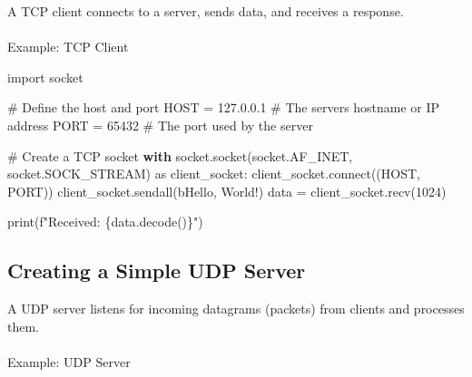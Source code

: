 \documentclass[
  letterpaper,
  DIV=11,
  numbers=noendperiod]{scrreprt}
\makeatletter
\let\oldparagraph\paragraph
\renewcommand{\paragraph}{
    \@ifstar
      \xxxParagraphStar
      \xxxParagraphNoStar
  }
\newcommand{\xxxParagraphStar}[1]{\oldparagraph*{#1}\mbox{}}
\newcommand{\xxxParagraphNoStar}[1]{\oldparagraph{#1}\mbox{}}
\newenvironment{Shaded}{\begin{snugshade}}{\end{snugshade}}
\newcommand{\BuiltInTok}[1]{\textcolor[rgb]{0.00,0.23,0.31}{#1}}
\newcommand{\CommentTok}[1]{\textcolor[rgb]{0.37,0.37,0.37}{#1}}
\newcommand{\ControlFlowTok}[1]{\textcolor[rgb]{0.00,0.23,0.31}{\textbf{#1}}}
\newcommand{\DecValTok}[1]{\textcolor[rgb]{0.68,0.00,0.00}{#1}}
\newcommand{\ExtensionTok}[1]{\textcolor[rgb]{0.00,0.23,0.31}{#1}}
\newcommand{\ImportTok}[1]{\textcolor[rgb]{0.00,0.46,0.62}{#1}}
\newcommand{\NormalTok}[1]{\textcolor[rgb]{0.00,0.23,0.31}{#1}}
\newcommand{\OperatorTok}[1]{\textcolor[rgb]{0.37,0.37,0.37}{#1}}
\newcommand{\SpecialCharTok}[1]{\textcolor[rgb]{0.37,0.37,0.37}{#1}}
\newcommand{\SpecialStringTok}[1]{\textcolor[rgb]{0.13,0.47,0.30}{#1}}
\newcommand{\StringTok}[1]{\textcolor[rgb]{0.13,0.47,0.30}{#1}}
\makeatother
\begin{document}
A TCP client connects to a server, sends data, and receives a response.

\paragraph{Example: TCP Client}\label{example-tcp-client}

\begin{Shaded}
\begin{Highlighting}[]
\ImportTok{import}\NormalTok{ socket}

\CommentTok{\# Define the host and port}
\NormalTok{HOST }\OperatorTok{=} \StringTok{\textquotesingle{}127.0.0.1\textquotesingle{}}  \CommentTok{\# The server\textquotesingle{}s hostname or IP address}
\NormalTok{PORT }\OperatorTok{=} \DecValTok{65432}        \CommentTok{\# The port used by the server}

\CommentTok{\# Create a TCP socket}
\ControlFlowTok{with}\NormalTok{ socket.socket(socket.AF\_INET, socket.SOCK\_STREAM) }\ImportTok{as}\NormalTok{ client\_socket:}
\NormalTok{    client\_socket.}\ExtensionTok{connect}\NormalTok{((HOST, PORT))}
\NormalTok{    client\_socket.sendall(}\StringTok{b\textquotesingle{}Hello, World!\textquotesingle{}}\NormalTok{)}
\NormalTok{    data }\OperatorTok{=}\NormalTok{ client\_socket.recv(}\DecValTok{1024}\NormalTok{)}

\BuiltInTok{print}\NormalTok{(}\SpecialStringTok{f"Received: }\SpecialCharTok{\{}\NormalTok{data}\SpecialCharTok{.}\NormalTok{decode()}\SpecialCharTok{\}}\SpecialStringTok{"}\NormalTok{)}
\end{Highlighting}
\end{Shaded}

\subsection{Creating a Simple UDP
Server}\label{creating-a-simple-udp-server}

A UDP server listens for incoming datagrams (packets) from clients and
processes them.

\paragraph{Example: UDP Server}\label{example-udp-server}
\end{document}
